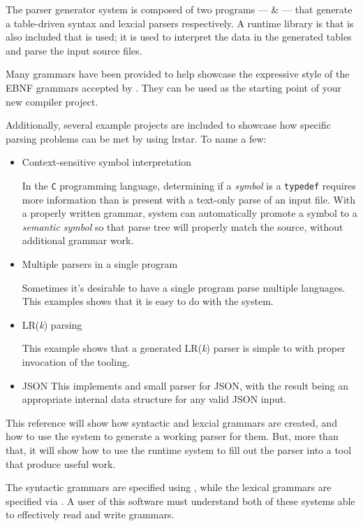 
The \lrstar parser generator system is composed of two programs ---
\lrstare \& \dfae --- that generate a table-driven syntax and lexcial
parsers respectively.  A runtime library is that is also included that
is used; it is used to interpret the data in the generated tables and
parse the input source files.

Many grammars have been provided to help showcase the expressive style
of the EBNF grammars accepted by \lrstar.  They can be used as the
starting point of your new compiler project.

Additionally, several example projects are included to showcase how
specific parsing problems can be met by using lrstar.  To name a few:

\begin{itemize}
\item Context-sensitive symbol interpretation

  In the \texttt{C} programming language, determining if a
  \emph{symbol} is a \texttt{typedef} requires more information than
  is present with a text-only parse of an input file.  With a properly
  written grammar, \lrstar system can automatically promote a symbol
  to a \emph{semantic symbol} so that parse tree will properly match
  the source, without additional grammar work.


\item Multiple parsers in a single program

  Sometimes it's desirable to have a single program parse multiple
  languages.  This examples shows that it is easy to do with the
  \lrstar system.


\item LR(\emph{k}) parsing

  This example shows that a generated LR(\emph{k}) parser is simple to
  with proper invocation of the \lrstar tooling.

\item JSON
  This implements and small parser for JSON, with the result being an
  appropriate internal data structure for any valid JSON input.
\end{itemize}


This reference will show how  syntactic and lexcial grammars are
created, and how to use the \lrstar system to generate a working
parser for them.  But, more than that, it will show how to use the
\lrstar runtime system to fill out the parser into a tool that produce
useful work.

The syntactic grammars are specified using \tbnfgrmfn, while the lexical
grammars are specified via \dfagrmfn.  A user of this software must
understand both of these systems able to effectively read and write
grammars.
